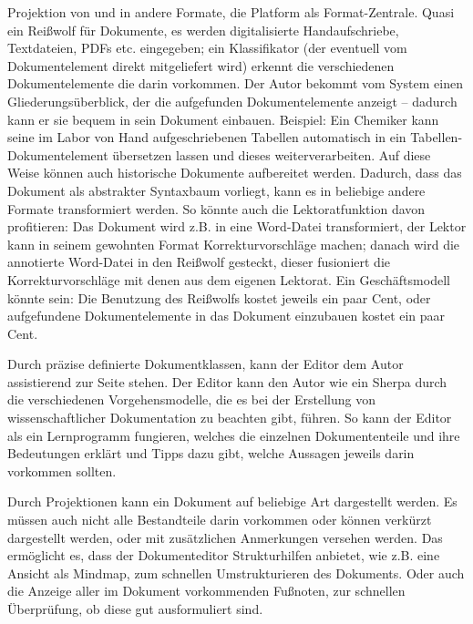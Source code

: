  
Projektion von und in andere Formate, die Platform als Format-Zentrale. Quasi ein Reißwolf für Dokumente, es werden digitalisierte Handaufschriebe, Textdateien, PDFs etc. eingegeben; ein Klassifikator (der eventuell vom Dokumentelement direkt mitgeliefert wird) erkennt die verschiedenen Dokumentelemente die darin vorkommen. Der Autor bekommt vom System einen Gliederungsüberblick, der die aufgefunden Dokumentelemente anzeigt -- dadurch kann er sie bequem in sein Dokument einbauen. Beispiel: Ein Chemiker kann seine im Labor von Hand aufgeschriebenen Tabellen automatisch in ein Tabellen-Dokumentelement übersetzen lassen und dieses weiterverarbeiten. Auf diese Weise können auch historische Dokumente aufbereitet werden. Dadurch, dass das Dokument als abstrakter Syntaxbaum vorliegt, kann es in beliebige andere Formate transformiert werden. So könnte auch die Lektoratfunktion davon profitieren: Das Dokument wird z.B. in eine Word-Datei transformiert, der Lektor kann in seinem gewohnten Format Korrekturvorschläge machen; danach wird die annotierte Word-Datei in den Reißwolf gesteckt, dieser fusioniert die Korrekturvorschläge mit denen aus dem eigenen Lektorat. Ein Geschäftsmodell könnte sein: Die Benutzung des Reißwolfs kostet jeweils ein paar Cent, oder aufgefundene Dokumentelemente in das Dokument einzubauen kostet ein paar Cent.

 
Durch präzise definierte Dokumentklassen, kann der Editor dem Autor assistierend zur Seite stehen. Der Editor kann den Autor wie ein Sherpa durch die verschiedenen Vorgehensmodelle, die es bei der Erstellung von wissenschaftlicher Dokumentation zu beachten gibt, führen. So kann der Editor als ein Lernprogramm fungieren, welches die einzelnen Dokumententeile und ihre Bedeutungen erklärt und Tipps dazu gibt, welche Aussagen jeweils darin vorkommen sollten.

 
Durch Projektionen kann ein Dokument auf beliebige Art dargestellt werden. Es müssen auch nicht alle Bestandteile darin vorkommen oder können verkürzt dargestellt werden, oder mit zusätzlichen Anmerkungen versehen werden. Das ermöglicht es, dass der Dokumenteditor Strukturhilfen anbietet, wie z.B. eine Ansicht als Mindmap, zum schnellen Umstrukturieren des Dokuments. Oder auch die Anzeige aller im Dokument vorkommenden Fußnoten, zur schnellen Überprüfung, ob diese gut ausformuliert sind.


